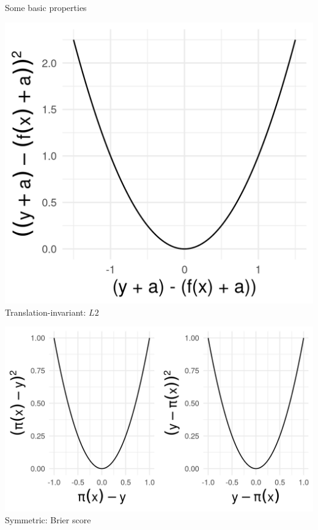 \documentclass[11pt,compress,t,notes=noshow, xcolor=table]{beamer}
\begin{document}
\begin{vbframe}{Some basic properties}
\begin{minipage}[b]{0.265\textwidth}
  \includegraphics[width=\textwidth]{figure/loss_transl_inv.png}
  \tiny \centering
  Translation-invariant: $L2$
\end{minipage}%
\begin{minipage}[b]{0.40\textwidth}
  \includegraphics[width=\textwidth]{figure/loss_symmetric}
  \tiny \centering
  Symmetric: Brier score
\end{minipage}

\end{vbframe}

\end{document}
